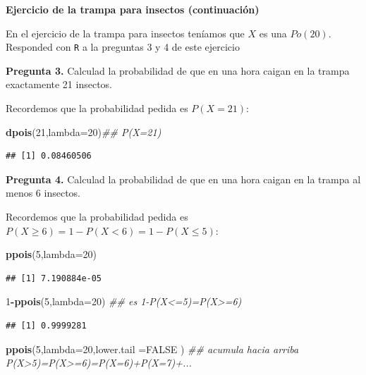 \documentclass[]{book}
\newenvironment{Shaded}{\begin{snugshade}}{\end{snugshade}}
\newcommand{\CommentTok}[1]{\textcolor[rgb]{0.56,0.35,0.01}{\textit{#1}}}
\newcommand{\DataTypeTok}[1]{\textcolor[rgb]{0.13,0.29,0.53}{#1}}
\newcommand{\DecValTok}[1]{\textcolor[rgb]{0.00,0.00,0.81}{#1}}
\newcommand{\KeywordTok}[1]{\textcolor[rgb]{0.13,0.29,0.53}{\textbf{#1}}}
\newcommand{\NormalTok}[1]{#1}
\newcommand{\OperatorTok}[1]{\textcolor[rgb]{0.81,0.36,0.00}{\textbf{#1}}}
\newcommand{\OtherTok}[1]{\textcolor[rgb]{0.56,0.35,0.01}{#1}}
\begin{document}
\textbf{Ejercicio de la trampa para insectos (continuación)}

En el ejercicio de la trampa para insectos teníamos que \(X\) es una \(Po(20)\). Responded con \texttt{R} a la preguntas 3 y 4 de este ejercicio

\textbf{Pregunta 3.} Calculad la probabilidad de que en una hora caigan en la trampa exactamente 21 insectos.

Recordemos que la probabilidad pedida es \(P(X=21)\):

\begin{Shaded}
\begin{Highlighting}[]
\KeywordTok{dpois}\NormalTok{(}\DecValTok{21}\NormalTok{,}\DataTypeTok{lambda=}\DecValTok{20}\NormalTok{)}\CommentTok{## P(X=21)}
\end{Highlighting}
\end{Shaded}

\begin{verbatim}
## [1] 0.08460506
\end{verbatim}

\textbf{Pregunta 4.} Calculad la probabilidad de que en una hora caigan en la trampa al menos 6 insectos.

Recordemos que la probabilidad pedida es \(P(X\geq 6)=1-P(X<6)=1-P(X\leq 5)\):

\begin{Shaded}
\begin{Highlighting}[]
\KeywordTok{ppois}\NormalTok{(}\DecValTok{5}\NormalTok{,}\DataTypeTok{lambda=}\DecValTok{20}\NormalTok{)}
\end{Highlighting}
\end{Shaded}

\begin{verbatim}
## [1] 7.190884e-05
\end{verbatim}

\begin{Shaded}
\begin{Highlighting}[]
\DecValTok{1}\OperatorTok{-}\KeywordTok{ppois}\NormalTok{(}\DecValTok{5}\NormalTok{,}\DataTypeTok{lambda=}\DecValTok{20}\NormalTok{) }\CommentTok{## es 1-P(X<=5)=P(X>=6)}
\end{Highlighting}
\end{Shaded}

\begin{verbatim}
## [1] 0.9999281
\end{verbatim}

\begin{Shaded}
\begin{Highlighting}[]
\KeywordTok{ppois}\NormalTok{(}\DecValTok{5}\NormalTok{,}\DataTypeTok{lambda=}\DecValTok{20}\NormalTok{,}\DataTypeTok{lower.tail =}\OtherTok{FALSE}\NormalTok{ ) }\CommentTok{## acumula hacia arriba P(X>5)=P(X>=6)=P(X=6)+P(X=7)+...}
\end{Highlighting}
\end{Shaded}
\end{document}
